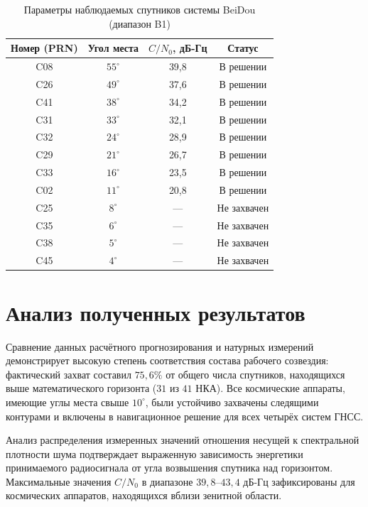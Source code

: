 \begin{table}[H]
    \centering
    \small
    \caption{Параметры наблюдаемых спутников системы BeiDou (диапазон B1)}
    \label{tab:bds_details}
    \begin{tabular}{|c|c|c|c|}
        \hline
        Номер (PRN) & Угол места & $C/N_0$, дБ-Гц & Статус \\
        \hline
        C08 & $55^\circ$ & 39,8 & В решении \\
        \hline
        C26 & $49^\circ$ & 37,6 & В решении \\
        \hline
        C41 & $38^\circ$ & 34,2 & В решении \\
        \hline
        C31 & $33^\circ$ & 32,1 & В решении \\
        \hline
        C32 & $24^\circ$ & 28,9 & В решении \\
        \hline
        C29 & $21^\circ$ & 26,7 & В решении \\
        \hline
        C33 & $16^\circ$ & 23,5 & В решении \\
        \hline
        C02 & $11^\circ$ & 20,8 & В решении \\
        \hline
        C25 & $8^\circ$ & --- & Не захвачен \\
        \hline
        C35 & $6^\circ$ & --- & Не захвачен \\
        \hline
        C38 & $5^\circ$ & --- & Не захвачен \\
        \hline
        C45 & $4^\circ$ & --- & Не захвачен \\
        \hline
    \end{tabular}
\end{table}

\section{Анализ полученных результатов}

Сравнение данных расчётного прогнозирования и натурных измерений демонстрирует высокую степень соответствия состава рабочего созвездия: фактический захват составил $75{,}6\%$ от общего числа спутников, находящихся выше математического горизонта ($31$ из $41$ НКА). Все космические аппараты, имеющие углы места свыше $10^\circ$, были устойчиво захвачены следящими контурами и включены в навигационное решение для всех четырёх систем ГНСС.

Анализ распределения измеренных значений отношения несущей к спектральной плотности шума подтверждает выраженную зависимость энергетики принимаемого радиосигнала от угла возвышения спутника над горизонтом. Максимальные значения $C/N_0$ в диапазоне $39{,}8\text{--}43{,}4\text{ дБ-Гц}$ зафиксированы для космических аппаратов, находящихся вблизи зенитной области.
